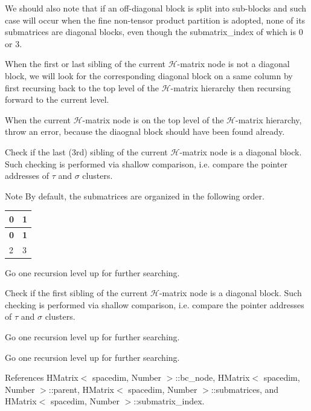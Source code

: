 We should also note that if an off-\/diagonal block is split into sub-\/blocks and such case will occur when the fine non-\/tensor product partition is adopted, none of its submatrices are diagonal blocks, even though the {\ttfamily submatrix\+\_\+index} of which is 0 or 3.

When the first or last sibling of the current $\mathcal{H}$-\/matrix node is not a diagonal block, we will look for the corresponding diagonal block on a same column by first recursing back to the top level of the $\mathcal{H}$-\/matrix hierarchy then recursing forward to the current level.

When the current $\mathcal{H}$-\/matrix node is on the top level of the $\mathcal{H}$-\/matrix hierarchy, throw an error, because the diaognal block should have been found already.

Check if the last (3rd) sibling of the current $\mathcal{H}$-\/matrix node is a diagonal block. Such checking is performed via shallow comparison, i.\+e. compare the pointer addresses of $\tau$ and $\sigma$ clusters.


\begin{DoxyDescription}
\item[Note ]By default, the submatrices are organized in the following order. {\ttfamily  \tabulinesep=1mm
\begin{longtabu} spread 0pt [c]{*{2}{|X[-1]}|}
\hline
\rowcolor{\tableheadbgcolor}\textbf{ 0 }&\textbf{ 1  }\\
\endfirsthead
\hline
\endfoot
\hline
\rowcolor{\tableheadbgcolor}\textbf{ 0 }&\textbf{ 1  }\\
 &3 \\
\end{longtabu}
} 
\end{DoxyDescription}

Go one recursion level up for further searching.

Check if the first sibling of the current $\mathcal{H}$-\/matrix node is a diagonal block. Such checking is performed via shallow comparison, i.\+e. compare the pointer addresses of $\tau$ and $\sigma$ clusters.

Go one recursion level up for further searching.

Go one recursion level up for further searching.

References H\+Matrix$<$ spacedim, Number $>$\+::bc\+\_\+node, H\+Matrix$<$ spacedim, Number $>$\+::parent, H\+Matrix$<$ spacedim, Number $>$\+::submatrices, and H\+Matrix$<$ spacedim, Number $>$\+::submatrix\+\_\+index.



